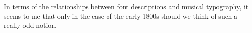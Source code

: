 \documentclass[10pt,busletter,useenvlab,faxheaderpage]{newlfm}
\begin{document}
\begin{newlfm}
In terms of the relationships between font
descriptions and musical typography, it seems to
me that only in the case of the early 1800s
should we think of such a really odd notion.
\end{newlfm}
\end{document}
